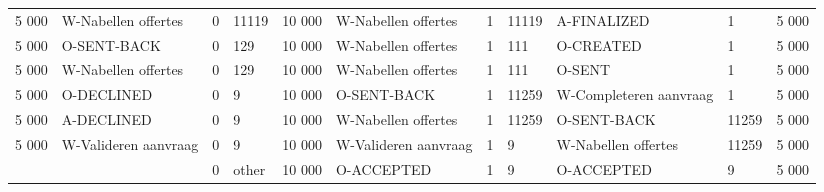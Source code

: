 \begin{tabular}{llllllllllr}
5 000 & W-Nabellen offertes & 0 & 11119 & 10 000 & W-Nabellen offertes & 1 & 11119 & A-FINALIZED & 1 & 5 000 \\
5 000 & O-SENT-BACK & 0 & 129 & 10 000 & W-Nabellen offertes & 1 & 111 & O-CREATED & 1 & 5 000 \\
5 000 & W-Nabellen offertes & 0 & 129 & 10 000 & W-Nabellen offertes & 1 & 111 & O-SENT & 1 & 5 000 \\
5 000 & O-DECLINED & 0 & 9 & 10 000 & O-SENT-BACK & 1 & 11259 & W-Completeren aanvraag & 1 & 5 000 \\
5 000 & A-DECLINED & 0 & 9 & 10 000 & W-Nabellen offertes & 1 & 11259 & O-SENT-BACK & 11259 & 5 000 \\
5 000 & W-Valideren aanvraag & 0 & 9 & 10 000 & W-Valideren aanvraag & 1 & 9 & W-Nabellen offertes & 11259 & 5 000 \\
 &  & 0 & other & 10 000 & O-ACCEPTED & 1 & 9 & O-ACCEPTED & 9 & 5 000 \\
\bottomrule
\end{tabular}
